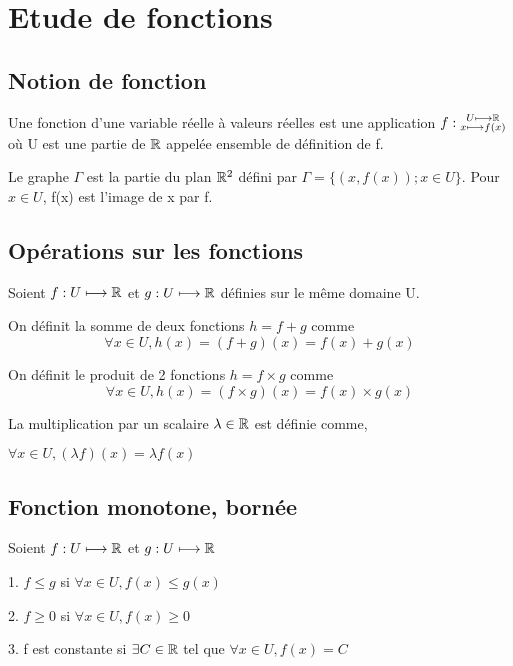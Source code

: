 \documentclass[a4paper, 12pt]{article}
\begin{document}
\section{Etude de fonctions}

\subsection{Notion de fonction}

\begin{definition}
    Une fonction d'une variable réelle à valeurs réelles est une application $f: \substack{U \longmapsto \mathbb{R} \\ x \longmapsto f(x)}$ où U est une partie de $\mathbb{R}$ appelée ensemble de définition de f.
\end{definition}

Le graphe $\Gamma$ est la partie du plan $\mathbb{R}^2$ défini par $\Gamma = \{(x, f(x)); x \in U\}$.
Pour $x \in U$, f(x) est l'image de x par f.

\subsection{Opérations sur les fonctions}

Soient $f: U \longmapsto \mathbb{R}$ et $g: U \longmapsto \mathbb{R}$ définies sur le même domaine U.

On définit la somme de deux fonctions $h = f + g$ comme
$$
\forall x \in U, h(x) = (f + g)(x) = f(x) + g(x)
$$

On définit le produit de 2 fonctions $h = f \times g$ comme
$$
\forall x \in U, h(x) = (f \times g)(x) = f(x) \times g(x)
$$

\begin{remark}
    La multiplication par un scalaire $\lambda \in \mathbb{R}$ est définie comme,\par $\forall x \in U, (\lambda f)(x) = \lambda f(x)$
\end{remark}

\subsection{Fonction monotone, bornée}

\begin{definition}
    Soient $f: U \longmapsto \mathbb{R}$ et $g: U \longmapsto \mathbb{R}$

    \item 1. $f \leq g$ si $\forall x \in U, f(x) \leq g(x)$
    \item 2. $f \geq 0$ si $\forall x \in U, f(x) \geq 0$
    \item 3. f est constante si $\exists C \in \mathbb{R}$ tel que $\forall x \in U, f(x) = C$
\end{definition}
\end{document}
